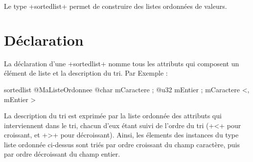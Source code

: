 



Le type \ggsq+sortedlist+ permet de construire des listes ordonnées de valeurs.




\section{Déclaration}

La déclaration d'une \ggsq+sortedlist+ nomme tous les attributs qui composent un élément de liste et la description du tri. Par Exemple :

\begin{galgas4}
sortedlist @MaListeOrdonnee {
  @char mCaractere ;
  @u32 mEntier ;
}{
  mCaractere <, mEntier >
}
\end{galgas4}

La description du tri est exprimée par la liste ordonnée des attributs qui interviennent dans le tri, chacun d'eux étant suivi de l'ordre du tri (\ggsq+<+ pour croissant, et \ggsq+>+ pour décroissant). Ainsi, les élements des instances du type liste ordonnée ci-dessus sont triés par ordre croissant du champ caractère, puis par ordre décroissant du champ entier.

